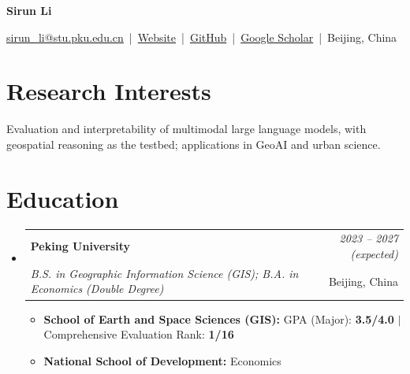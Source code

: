 \documentclass[a4paper,11pt]{article}
\makeatletter
\newcommand{\resumeSubheading}[4]{
\vspace{0.5mm}\item
    \begin{tabular*}{0.98\textwidth}[t]{l@{\extracolsep{\fill}}r}
        \textbf{#1} & \textit{\footnotesize{#4}} \\
        \textit{\footnotesize{#3}} &  \footnotesize{#2}\\
    \end{tabular*}
    \vspace{-2.4mm}
}
\newcommand{\resumeSubHeadingListStart}{\begin{itemize}[leftmargin=*,labelsep=1mm]}
\newcommand{\resumeItemListStart}{\begin{itemize}[leftmargin=*,labelsep=1mm,itemsep=0.5mm]}
\newcommand{\resumeSubHeadingListEnd}{\end{itemize}\vspace{2mm}}
\newcommand{\resumeItemListEnd}{\end{itemize}\vspace{-2mm}}
\newcommand{\headerfontiii}{\fontfamily{ppl}\selectfont} %
\makeatother
\begin{document}
\headerfontiii

\begin{center}
    {\Huge\textbf{Sirun Li}}
\end{center}
\vspace{-6mm}

\begin{center}
    \small{
    \href{mailto:sirun_li@stu.pku.edu.cn}{sirun\_li@stu.pku.edu.cn} \,|\, 
    \href{https://inorganicwriter.github.io}{Website} \,|\, 
    \href{https://github.com/inorganicwriter}{GitHub} \,|\, 
    \href{https://scholar.google.com/citations?hl=zh-CN&user=bWZazE4AAAAJ}{Google Scholar} \,|\, Beijing, China
    }
\end{center}

\vspace{-4mm}

\section{\textbf{Research Interests}}
\vspace{1mm}
\small{
Evaluation and interpretability of multimodal large language models, with geospatial reasoning as the testbed; applications in GeoAI and urban science.
}
\vspace{-2mm}

\section{\textbf{Education}}
\vspace{-0.4mm}
\resumeSubHeadingListStart

\resumeSubheading
{Peking University}{Beijing, China}
{B.S. in Geographic Information Science (GIS); B.A. in Economics (Double Degree)}{2023 -- 2027 (expected)}
\resumeItemListStart
\item \textbf{School of Earth and Space Sciences (GIS):} GPA (Major): \textbf{3.5/4.0} $|$ Comprehensive Evaluation Rank: \textbf{1/16}
\item \textbf{National School of Development:} Economics
\resumeItemListEnd

\resumeSubHeadingListEnd
\vspace{-6mm}

\end{document}
